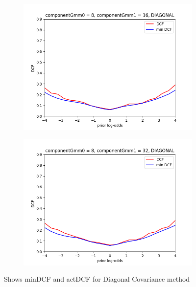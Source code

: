 \begin{figure}[h!]
\begin{subfigure}[b]{0.23\linewidth}
        \includegraphics[width=\linewidth]{Lab/10. Lab 10/Images/09. 8-16 Diag}
        \label{fig:GMM816Diag}
    \end{subfigure}
    \begin{subfigure}[b]{0.23\linewidth}
        \includegraphics[width=\linewidth]{Lab/10. Lab 10/Images/10. 8-32 Diag}
        \label{fig:GMM832Diag}
    \end{subfigure}
    \caption{Shows minDCF and actDCF for Diagonal Covariance method}
    \label{fig:GMMDiagBest}
\end{figure}

